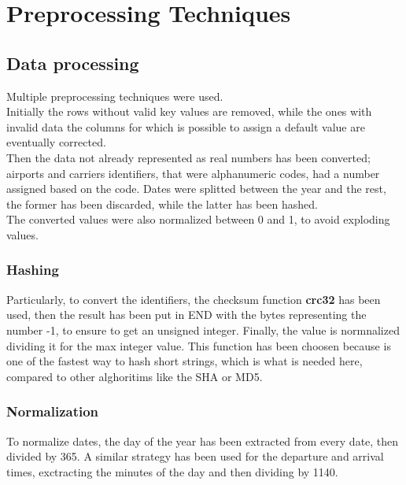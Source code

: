 \documentclass[
	letterpaper, %
	10pt, %
]{class}
\begin{document}
\section{Preprocessing Techniques}

\subsection{Data processing}

Multiple preprocessing techniques were used.\\

Initially the rows without valid key values are removed, while the ones with invalid data the columns for which is possible to assign a default value are eventually corrected.\\

Then the data not already represented as real numbers has been converted; airports and carriers identifiers, that were alphanumeric codes, had a number assigned based on the code. Dates were splitted between the year and the rest, the former has been discarded, while the latter has been hashed.\\

The converted values were also normalized between 0 and 1, to avoid exploding values.\\

\subsubsection{Hashing}

Particularly, to convert the identifiers, the checksum function \textbf{crc32} \cite{crc32} has been used, then the result has been put in END with the bytes representing the number -1, to ensure to get an unsigned integer. Finally, the value is normnalized dividing it for the max integer value.
This function has been choosen because is one of the fastest way to hash short strings, which is what is needed here, compared to other alghoritims like the SHA or MD5.\\

\subsubsection{Normalization}

To normalize dates, the day of the year has been extracted from every date, then divided by 365. A similar strategy has been used for the departure and arrival times, exctracting the minutes of the day and then dividing by 1140.\\
\end{document}

